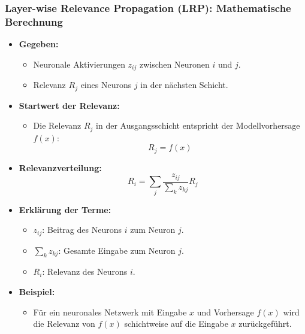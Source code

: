\documentclass[aspectratio=1610, xcolor=dvipsnames, 9pt]{beamer}
\begin{document}
\begin{frame}
  \frametitle{Layer-wise Relevance Propagation (LRP): Mathematische Berechnung}
  \begin{itemize}
    \item \textbf{Gegeben:}
    \begin{itemize}
      \item Neuronale Aktivierungen $z_{ij}$ zwischen Neuronen $i$ und $j$.
      \item Relevanz $R_j$ eines Neurons $j$ in der nächsten Schicht.
    \end{itemize}
    \item \textbf{Startwert der Relevanz:}
    \begin{itemize}
      \item Die Relevanz $R_j$ in der Ausgangsschicht entspricht der Modellvorhersage $f(x)$:
      \[
      R_j = f(x)
      \]
    \end{itemize}
    \item \textbf{Relevanzverteilung:}
    \[
    R_i = \sum_j \frac{z_{ij}}{\sum_k z_{kj}} R_j
    \]
    \item \textbf{Erklärung der Terme:}
    \begin{itemize}
      \item $z_{ij}$: Beitrag des Neurons $i$ zum Neuron $j$.
      \item $\sum_k z_{kj}$: Gesamte Eingabe zum Neuron $j$.
      \item $R_i$: Relevanz des Neurons $i$.
    \end{itemize}
    \item \textbf{Beispiel:}
    \begin{itemize}
      \item Für ein neuronales Netzwerk mit Eingabe $x$ und Vorhersage $f(x)$ wird die Relevanz von $f(x)$ schichtweise auf die Eingabe $x$ zurückgeführt.
    \end{itemize}
  \end{itemize}
\end{frame}
\end{document}
